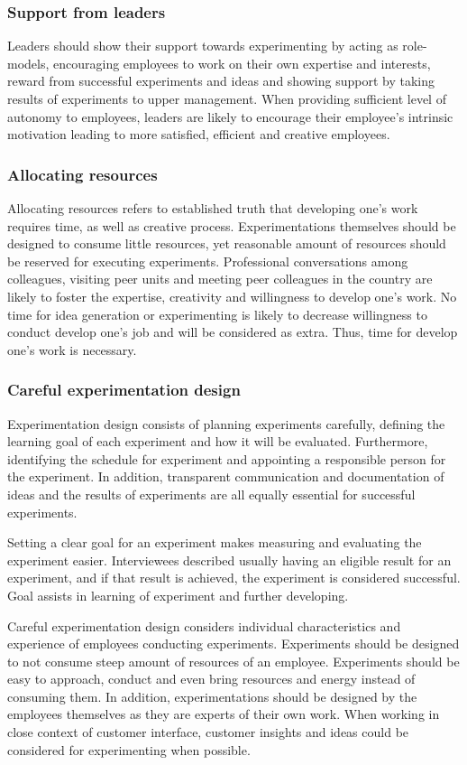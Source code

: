 \subsubsection*{Support from leaders}
Leaders should show their support towards experimenting by acting as role-models, encouraging employees to work on their own expertise and interests, reward from successful experiments and ideas and showing support by taking results of experiments to upper management. When providing sufficient level of autonomy to employees, leaders are likely to encourage their employee's intrinsic motivation leading to more satisfied, efficient and creative employees. 

\subsubsection*{Allocating resources}
Allocating resources refers to established truth that developing one's work requires time, as well as creative process. Experimentations themselves should be designed to consume little resources, yet reasonable amount of resources should be reserved for executing experiments. Professional conversations among colleagues, visiting peer units and meeting peer colleagues in the country are likely to foster the expertise, creativity and willingness to develop one's work. No time for idea generation or experimenting is likely to decrease willingness to conduct develop one's job and will be considered as extra. Thus, time for develop one's work is necessary. 

\subsubsection*{Careful experimentation design}
Experimentation design consists of planning experiments carefully, defining the learning goal of each experiment and how it will be evaluated. Furthermore, identifying the schedule for experiment and appointing a responsible person for the experiment. In addition, transparent communication and documentation of ideas and the results of experiments are all equally essential for successful experiments.  

Setting a clear goal for an experiment makes measuring and evaluating the experiment easier. Interviewees described usually having an eligible result for an experiment, and if that result is achieved, the experiment is considered successful. Goal assists in learning of experiment and further developing. 

Careful experimentation design considers individual characteristics and experience of employees conducting experiments. Experiments should be designed to not consume steep amount of resources of an employee. Experiments should be easy to approach, conduct and even bring resources and energy instead of consuming them. In addition, experimentations should be designed by the employees themselves as they are experts of their own work. When working in close context of customer interface, customer insights and ideas could be considered for experimenting when possible. 

